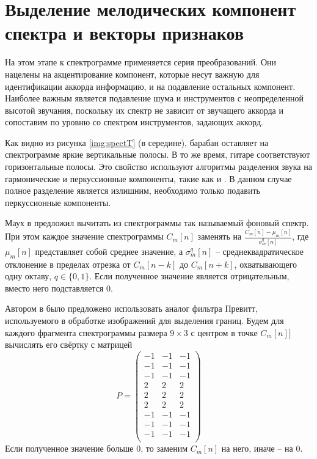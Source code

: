 

\section{Выделение мелодических компонент спектра и векторы признаков}
\label{sect1_feat}

На этом этапе к спектрограмме применяется серия преобразований. Они нацелены на
акцентирование компонент, которые несут важную для идентификации аккорда
информацию, и на подавление остальных компонент. Наиболее важным является
подавление шума и инструментов с неопределенной высотой звучания, поскольку их
спектр не зависит от звучащего аккорда и сопоставим по уровню со спектром
инструментов, задающих аккорд.

Как видно из рисунка \ref{img:spectT} (в середине), барабан оставляет на
спектрограмме яркие вертикальные полосы. В то же время, гитаре соответствуют
горизонтальные полосы. Это свойство используют алгоритмы разделения звука на
гармонические и перкуссионные компоненты, такие как \cite{Ono2008} и
\cite{Fitzgerald2010}. В данном случае полное разделение является излишним,
необходимо только подавить перкуссионные компоненты.

Маух в \cite{Mauch2010} предложил вычитать из спектрограммы так называемый
фоновый спектр. При этом каждое значение спектрограммы $C_m[n]$ заменять на
$\frac{C_m[n] - \mu_m[n]}{\sigma_m^q[n]}$, где $\mu_m[n]$ представляет собой
среднее значение, а $\sigma_m^q[n]$ -- среднеквадратическое отклонение в
пределах отрезка от $C_m[n-k]$ до $C_m[n+k]$, охватывающего одну октаву, $q \in
\{0, 1\}$. Если полученное значение является отрицательным, вместо него
подставляется 0.

Автором в \cite{Glazyrin2012} было предложено использовать аналог фильтра
Превитт, используемого в обработке изображений для выделения границ. Будем
для каждого фрагмента спектрограммы размера $9 \times 3$ с центром в точке
$C_m[n]]$ вычислять его свёртку с матрицей
$$P = \begin{pmatrix}
-1 & -1 & -1\\
-1 & -1 & -1\\
-1 & -1 & -1\\
2 & 2 & 2\\
2 & 2 & 2\\
2 & 2 & 2\\
-1 & -1 & -1\\
-1 & -1 & -1\\
-1 & -1 & -1\\
\end{pmatrix}$$
Если полученное значение больше 0, то заменим $C_m[n]$ на него, иначе -- на 0.

